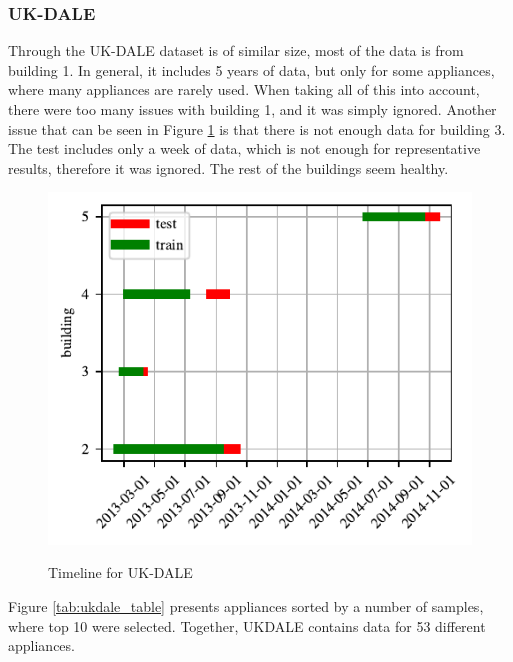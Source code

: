 \subsubsection{UK-DALE} 

Through the UK-DALE \cite{UKDALE} dataset is of similar size, most of the data is from building 1.
In general, it includes 5 years of data, but only for some appliances, where many appliances are rarely used.
When taking all of this into account, there were too many issues with building 1, and it was simply ignored.
Another issue that can be seen in Figure \ref{fig:ukdale_timeline} is that there is not enough data for 
building 3. The test includes only a week of data, which is not enough for representative results, therefore it was ignored.
The rest of the buildings seem healthy.

\begin{figure}[H]
	\centering
	\caption{Timeline for UK-DALE}
	\includegraphics[]{Figures/EC/ukdale_timeline.pdf}
	\label{fig:ukdale_timeline}
\end{figure}

Figure \ref{tab:ukdale_table} presents appliances sorted by a number of samples, where top 10 were selected.
Together, UKDALE contains data for 53 different appliances.

